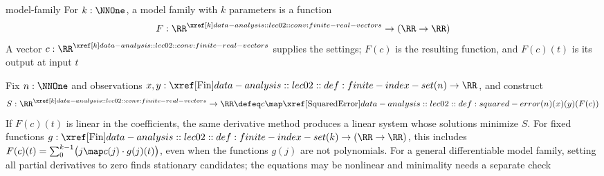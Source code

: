 \documentclass[12pt]{article}
\numberwithin{figure}{section}
\begin{document}
\begin{dfn}{model-family}
    For $k:\NNOne$, a model family with $k$ parameters is a function
    \[
      F:\RealVectors{k}\to(\RR\to\RR)
    \]
    A vector $c:\RealVectors{k}$ supplies the settings; $F(c)$ is the
    resulting function, and $F(c)(t)$ is its output at input $t$
\end{dfn}

\begin{rem} 
Fix $n:\NNOne$ and observations $x,y:\Fin(n)\to\RR$, and construct
\[
  S:\RealVectors{k}\to\RR
    \defeq c\map\SquaredError(n)(x)(y)(F(c))
\]
If $F(c)(t)$ is linear in the coefficients, the same derivative method
produces a linear system whose solutions minimize $S$.
For fixed functions $g:\Fin(k)\to(\RR\to\RR)$, this includes
$F(c)(t)=\sum_0^{k-1}\bigl(j\map c(j)\cdot g(j)(t)\bigr)$,
even when the functions $g(j)$ are not polynomials.
For a general differentiable model family, setting all partial derivatives
to zero finds stationary candidates; the equations may be nonlinear and
minimality needs a separate check
\end{rem} 
\end{document}
